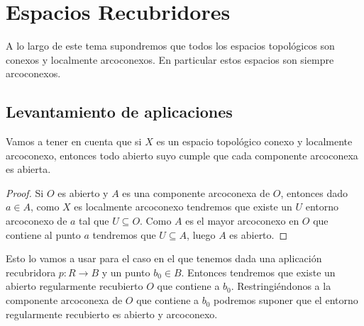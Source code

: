 \chapter{Espacios Recubridores}

\begin{observacion}
    A lo largo de este tema supondremos que todos los espacios topológicos son conexos y localmente arcoconexos. En particular estos espacios son siempre arcoconexos.
\end{observacion}

\section{Levantamiento de aplicaciones}

\begin{observacion}
    Vamos a tener en cuenta que si $X$ es un espacio topológico conexo y localmente arcoconexo, entonces todo abierto suyo cumple que cada componente arcoconexa es abierta.

    \begin{proof}
        Si $O$ es abierto y $A$ es una componente arcoconexa de $O$, entonces dado $a\in A$, como $X$ es localmente arcoconexo tendremos que existe un $U$ entorno arcoconexo de $a$ tal que $U\subseteq O$. Como $A$ es el mayor arcoconexo en $O$ que contiene al punto $a$ tendremos que $U\subseteq A$, luego $A$ es abierto.
    \end{proof}
    
    Esto lo vamos a usar para el caso en el que tenemos dada una aplicación recubridora $p:R\to B$ y un punto $b_0\in B$. Entonces tendremos que existe un abierto regularmente recubierto $O$ que contiene a $b_0$. Restringiéndonos a la componente arcoconexa de $O$ que contiene a $b_0$ podremos suponer que el entorno regularmente recubierto es abierto y arcoconexo.
\end{observacion}

